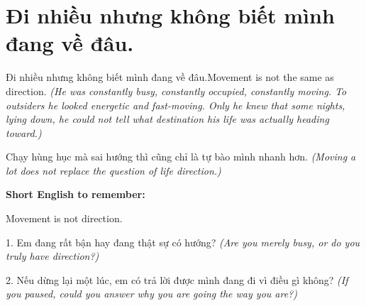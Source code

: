 \section{Đi nhiều nhưng không biết mình đang về đâu.}
\begin{truyen}{Đi nhiều nhưng không biết mình đang về đâu.}{Movement is not the same as direction.}
\textit{(He was constantly busy, constantly occupied, constantly moving. To outsiders he looked energetic and fast-moving. Only he knew that some nights, lying down, he could not tell what destination his life was actually heading toward.)}
\end{truyen}
\begin{baihoc}
Chạy hùng hục mà sai hướng thì cũng chỉ là tự bào mình nhanh hơn.
\textit{(Moving a lot does not replace the question of life direction.)}
\end{baihoc}
\begin{ghinhoanh}
\textbf{Short English to remember:}

Movement is not direction.
\end{ghinhoanh}
\begin{tuhocnhanh}
1. Em đang rất bận hay đang thật sự có hướng? \textit{(Are you merely busy, or do you truly have direction?)}

2. Nếu dừng lại một lúc, em có trả lời được mình đang đi vì điều gì không? \textit{(If you paused, could you answer why you are going the way you are?)}
\end{tuhocnhanh}
\ngancach

